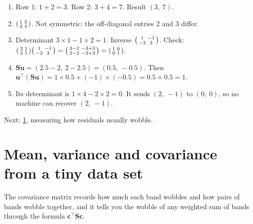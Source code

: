 \documentclass[11pt,a4paper,oneside,openany]{book}
\newcommand{\B}[1]{{\symbf{#1}}}
\newcommand{\B}[1]{{\bm{#1}}}
\newcommand{\T}{^{\top}}
\newcommand{\vu}{\B{u}}
\newcommand{\vc}{\B{c}}
\newcommand{\mS}{\B{S}}
\newcommand{\nextchapter}[1]{\par\medskip\noindent\hfill\textsf{\small Next: #1}\par}
\begin{document}
\begin{answers}
\begin{enumerate}
\item Row 1: $1+2=3$. Row 2: $3+4=7$. Result $(3,\ 7)$.
\item $\begin{psmallmatrix}1&3\\2&4\end{psmallmatrix}$. Not symmetric: the off-diagonal entries 2 and 3 differ.
\item Determinant $3\times1-1\times2=1$. Inverse $\begin{psmallmatrix}1&-1\\-2&3\end{psmallmatrix}$. Check:
  $\begin{psmallmatrix}3&1\\2&1\end{psmallmatrix}\begin{psmallmatrix}1&-1\\-2&3\end{psmallmatrix}
  =\begin{psmallmatrix}3-2&-3+3\\2-2&-2+3\end{psmallmatrix}=\begin{psmallmatrix}1&0\\0&1\end{psmallmatrix}$.
\item $\mS\vu=(2.5-2,\ 2-2.5)=(0.5,\ -0.5)$. Then $\vu\T(\mS\vu)=1\times0.5+(-1)\times(-0.5)=0.5+0.5=1$.
\item Its determinant is $1\times4-2\times2=0$. It sends $(2,\ -1)$ to $(0,\ 0)$, so no machine can recover $(2,\ -1)$.
\end{enumerate}
\end{answers}

\nextchapter{\cref{ch:cov}, measuring how residuals usually wobble.}

\chapter{Mean, variance and covariance from a tiny data set}
\label{ch:cov}

\begin{onething}
The covariance matrix records how much each band wobbles and how pairs of bands wobble together, and it tells you the
wobble of any weighted sum of bands through the formula $\vc\T\mS\vc$.
\end{onething}
\end{document}

